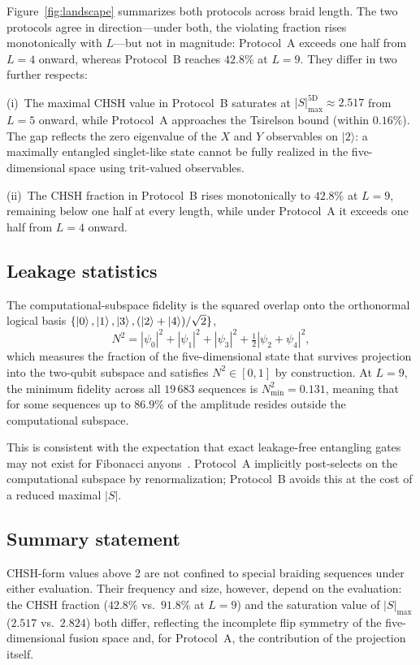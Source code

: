 \documentclass[aps,pra,twocolumn,superscriptaddress,longbibliography,floatfix,nofootinbib]{revtex4-2}
\begin{document}
Figure~\ref{fig:landscape} summarizes both protocols across braid
length. The two protocols agree in direction---under both, the violating
fraction rises monotonically with $L$---but not in magnitude:
Protocol~A exceeds one half from $L=4$ onward, whereas Protocol~B
reaches $42.8\%$ at $L=9$. They differ in two further respects:

(i)~The maximal CHSH value in Protocol~B saturates at
$|S|^{5\text{D}}_{\max}\approx 2.517$ from $L=5$ onward,
while Protocol~A approaches the Tsirelson bound (within $0.16\%$).
The gap reflects the zero eigenvalue of the $X$ and $Y$ observables
on $|2\rangle$: a maximally entangled singlet-like state cannot be
fully realized in the five-dimensional space using trit-valued
observables.

(ii)~The CHSH fraction in Protocol~B rises monotonically to $42.8\%$ at
$L=9$, remaining below one half at every length, while under Protocol~A
it exceeds one half from $L=4$ onward.

\subsection{Leakage statistics}

The computational-subspace fidelity is the squared overlap onto the
orthonormal logical basis
$\{\ket{0},\ket{1},\ket{3},(\ket{2}+\ket{4})/\sqrt{2}\}$,
\begin{equation}
N^2 = |\psi_0|^2 + |\psi_1|^2 + |\psi_3|^2 + \tfrac{1}{2}|\psi_2+\psi_4|^2,
\end{equation}
which measures the fraction of the five-dimensional state that
survives projection into the two-qubit subspace and satisfies
$N^2\in[0,1]$ by construction.
At $L=9$, the minimum fidelity across all $19\,683$ sequences is
$N^2_{\min} = 0.131$, meaning that for some sequences up to $86.9\%$
of the amplitude resides outside the computational subspace.

This is consistent with the expectation that exact leakage-free
entangling gates may not exist for Fibonacci anyons~\cite{Cui2019}.
Protocol~A implicitly post-selects on the computational subspace by
renormalization; Protocol~B avoids this at the cost of a reduced
maximal $|S|$.

\subsection{Summary statement}

CHSH-form values above 2 are not confined to special braiding sequences
under either evaluation. Their frequency and size, however, depend on
the evaluation:
the CHSH fraction ($42.8\%$ vs.\ $91.8\%$ at $L=9$)
and the saturation value of $|S|_{\max}$ ($2.517$ vs.\ $2.824$)
both differ, reflecting the incomplete flip symmetry of the
five-dimensional fusion space and, for Protocol~A, the contribution of
the projection itself.
\end{document}
